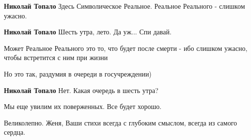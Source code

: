 \begin{itemize}
\begin{itemize}
\textbf{Николай Топало} Здесь Символическое Реальное. Реальное Реального - слишком ужасно.

 
\textbf{Николай Топало} Шесть утра, лето. Да уж... Спи давай.

 

Может Реальное Реального это то, что будет после смерти - ибо слишком ужасно, чтобы встретится с ним при жизни

Но это так, раздумия в очереди в госучреждении)

 
\textbf{Николай Топало} Нет. Какая очередь в шесть утра?
\end{itemize}

 
Мы еще увилим их поверженных. Все будет хорошо.

 
Великолепно. Женя, Ваши стихи всегда с глубоким смыслом, всегда из самого сердца.

 

\end{itemize}

